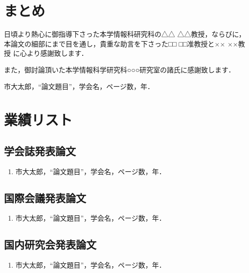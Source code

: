 \documentclass[12pt,dvipdfmx]{mthesis_utf8}
\begin{document}




\chapter{まとめ}




\begin{acknowledgment}
日頃より熱心に御指導下さった本学情報科研究科の△△ △△教授，ならびに，
本論文の細部にまで目を通し，貴重な助言を下さった□□ □□准教授と×× ××教授
に心より感謝致します．

また，御討論頂いた本学情報科学研究科○○○研究室の諸氏に感謝致します．
\end{acknowledgment}


%
\begin{thebibliography}{99}
市大太郎，“論文題目”，学会名，ページ数，年．
%
\end{thebibliography}
%
\chapter*{業績リスト}

\section*{学会誌発表論文}
\begin{enumerate}
%
\item 市大太郎，“論文題目”，学会名，ページ数，年．
%
\end{enumerate}

\section*{国際会議発表論文}
\begin{enumerate}
%
\item 市大太郎，“論文題目”，学会名，ページ数，年．
%
\end{enumerate}

\section*{国内研究会発表論文}
\begin{enumerate}
%
\item 市大太郎，“論文題目”，学会名，ページ数，年．
%
\end{enumerate}
%
\end{document}
